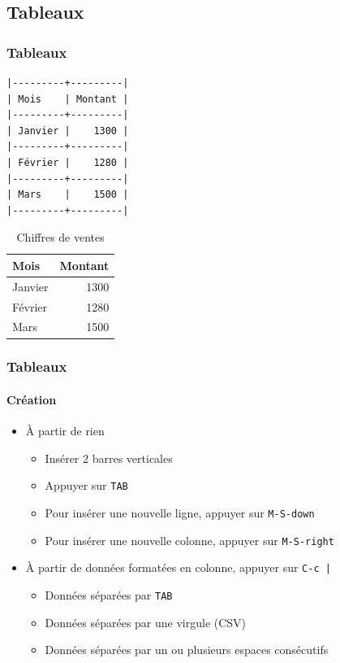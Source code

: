 \documentclass[presentation,t,hideothersubsections]{beamer}
\begin{document}
\subsection{Tableaux}
\label{sec-3-3}
\begin{frame}[fragile]
\frametitle{Tableaux}
\label{sec-3-3-1}



\lstset{language=org}
\begin{lstlisting}
|---------+---------|
| Mois    | Montant |
|---------+---------|
| Janvier |    1300 |
|---------+---------|
| Février |    1280 |
|---------+---------|
| Mars    |    1500 |
|---------+---------|
\end{lstlisting}

\begin{table}[!htbp]
\caption{Chiffres de ventes} 
\begin{center}
\begin{tabular}{|l|r|}
\hline
 Mois     &  Montant  \\
\hline
 Janvier  &     1300  \\
\hline
 Février  &     1280  \\
\hline
 Mars     &     1500  \\
\hline
\end{tabular}
\end{center}
\end{table}
\end{frame}
\begin{frame}
\frametitle{Tableaux}
\framesubtitle{Création}
\label{sec-3-3-2}


\begin{itemize}
\item À partir de rien
\begin{itemize}
\item Insérer 2 barres verticales
\item Appuyer sur \texttt{TAB}
\item Pour insérer une nouvelle ligne, appuyer sur \texttt{M-S-down}
\item Pour insérer une nouvelle colonne, appuyer sur \texttt{M-S-right}
\end{itemize}
\item À partir de données formatées en colonne, appuyer sur \texttt{C-c |}
\begin{itemize}
\item Données séparées par \texttt{TAB}
\item Données séparées par une virgule (CSV)
\item Données séparées par un ou plusieurs espaces consécutifs
\end{itemize}
\end{itemize}
\end{frame}
\end{document}
